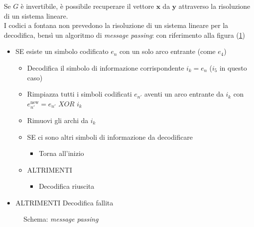 \documentclass[italian, a4paper, 12pt]{article}
\begin{document}
Se $G$ è invertibile, è possibile recuperare il vettore $\bm{x}$ da $\bm{y}$ attraverso la risoluzione di un sistema lineare.\\
I codici a fontana non prevedono la risoluzione di un sistema lineare per la decodifica, bensì un algoritmo di \textit{message passing}: con riferimento alla figura (\ref{fig:FC})
\begin{itemize}
	\item SE esiste un simbolo codificato $e_n$ con un solo arco entrante (come $e_4$)\begin{itemize}
		\item	Decodifica il simbolo di informazione corrispondente $i_k=e_n$ ($i_5$ in questo caso)
		\item	Rimpiazza tutti i simboli codificati $e_{n'}$ aventi un arco entrante da $i_k$ con $e_{n'}^{\text{new}} = e_{n'} \textit{ XOR } i_k$
		\item 	Rimuovi gli archi da $i_k$
		\item 	SE ci sono altri simboli di informazione da decodificare \begin{itemize}
			\item Torna all'inizio
		\end{itemize}
		\item ALTRIMENTI\begin{itemize}
			\item Decodifica riuscita
		\end{itemize}
	\end{itemize}
	
	\item ALTRIMENTI Decodifica fallita
\end{itemize}
\begin{figure}[H]
    \centering
    \caption{Schema: \textit{message passing}}
    \label{fig:FC}
\end{figure}
\newpage
\end{document}
